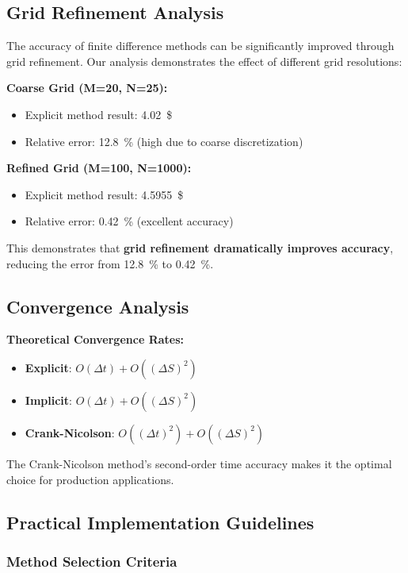 \documentclass[12pt,a4paper]{article}
\newcommand{\M}{M}
\newcommand{\N}{N}
\numberwithin{algorithm}{subsection}
\begin{document}
\subsection{Grid Refinement Analysis}

The accuracy of finite difference methods can be significantly improved through grid refinement. Our analysis demonstrates the effect of different grid resolutions:

\textbf{Coarse Grid (\M=\num{20}, \N=\num{25}):}
\begin{itemize}
\item Explicit method result: \SI{4.02}{\$}
\item Relative error: \SI{12.8}{\percent} (high due to coarse discretization)
\end{itemize}

\textbf{Refined Grid (\M=\num{100}, \N=\num{1000}):}
\begin{itemize}
\item Explicit method result: \SI{4.5955}{\$}
\item Relative error: \SI{0.42}{\percent} (excellent accuracy)
\end{itemize}

This demonstrates that \textbf{grid refinement dramatically improves accuracy}, reducing the error from \SI{12.8}{\percent} to \SI{0.42}{\percent}.

\subsection{Convergence Analysis}

\textbf{Theoretical Convergence Rates:}
\begin{itemize}
\item \textbf{Explicit}: $O(\Delta t) + O((\Delta S)^2)$
\item \textbf{Implicit}: $O(\Delta t) + O((\Delta S)^2)$
\item \textbf{Crank-Nicolson}: $O((\Delta t)^2) + O((\Delta S)^2)$
\end{itemize}

The Crank-Nicolson method's second-order time accuracy makes it the optimal choice for production applications.

\subsection{Practical Implementation Guidelines}

\subsubsection{Method Selection Criteria}
\end{document}
